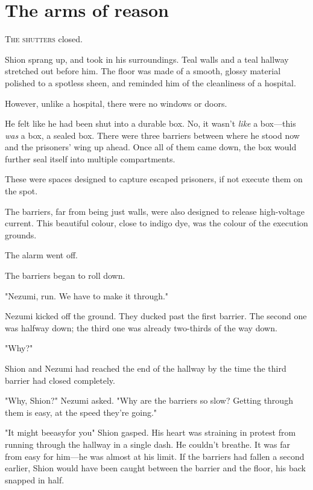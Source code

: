 
\chapter{The arms of reason}


\lettrine{T}{he shutters} closed.

Shion sprang up, and took in his surroundings. Teal walls and a teal
hallway stretched out before him. The floor was made of a smooth, glossy
material polished to a spotless sheen, and reminded him of the
cleanliness of a hospital.

However, unlike a hospital, there were no windows or doors.

He felt like he had been shut into a durable box. No, it wasn't \emph{like} a
box---this \emph{was} a box, a sealed box. There were three barriers between
where he stood now and the prisoners' wing up ahead. Once all of them
came down, the box would further seal itself into multiple compartments.

These were spaces designed to capture escaped prisoners, if not execute
them on the spot.

The barriers, far from being just walls, were also designed to release
high-voltage current. This beautiful colour, close to indigo dye, was
the colour of the execution grounds.

The alarm went off.

The barriers began to roll down.

"Nezumi, run. We have to make it through."

Nezumi kicked off the ground. They ducked past the first barrier. The
second one was halfway down; the third one was already two-thirds of the
way down.

"Why?"

Shion and Nezumi had reached the end of the hallway by the time the
third barrier had closed completely.

"Why, Shion?" Nezumi asked. "Why are the barriers so slow? Getting
through them is easy, at the speed they're going."

"It might be\el easy\el for you\el " Shion gasped. His heart was
straining in protest from running through the hallway in a single dash.
He couldn't breathe. It was far from easy for him---he was almost at his
limit. If the barriers had fallen a second earlier, Shion would have
been caught between the barrier and the floor, his back snapped in half.

